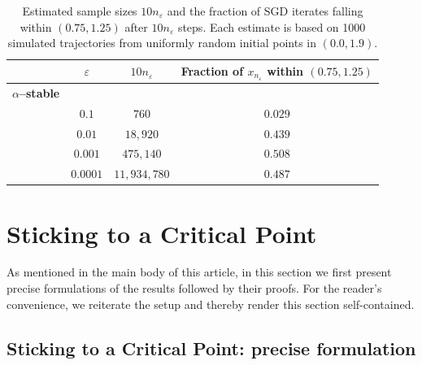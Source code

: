 \documentclass{article}
\theoremstyle{plain}
\theoremstyle{definition}
\theoremstyle{remark}
\begin{document}
\begin{table}[ht]
  \centering
  \small
  \begin{tabular}{%
    l  %
    c  %
    c  %
    c  %
  }
  \toprule
  & $\varepsilon$ 
  & $10 n_{\varepsilon}$
  & Fraction of $x_{n_\varepsilon}$ within $(0.75,1.25)$ \\
  \midrule
  \textbf{$\alpha$–stable}\\[-0.3em]
    & $0.1$     & $760$           & $0.029$ \\
    & $0.01$    & $18,920$        & $0.439$ \\
    & $0.001$   & $475,140$       & $0.508$ \\
    & $0.0001$  & $11,934,780$    & $0.487$ \\
  \bottomrule
  \end{tabular}
  \caption{Estimated sample sizes $10 n_{\varepsilon}$ and the fraction of SGD iterates falling within $(0.75, 1.25)$ after $10 n_{\varepsilon}$ steps. Each estimate is based on 1000 simulated trajectories from uniformly random initial points in $(0.0, 1.9)$.}
  \label{tab:levy_extended}
\end{table}



\section{Sticking to a Critical Point}\label{sec_ap_4}

As mentioned in the main body of this article, in this section we first present precise formulations of the results followed by their proofs. For the reader's convenience, we reiterate the setup and thereby render this section self-contained.

\subsection{Sticking to a Critical Point: precise formulation} 
\end{document}
